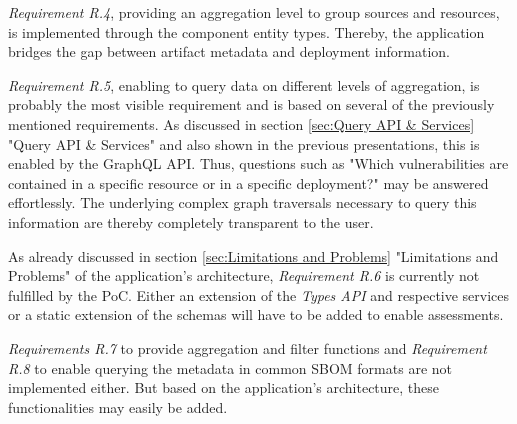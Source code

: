 \emph{Requirement R.4}, providing an aggregation level to group sources and resources, is implemented through the component entity types. Thereby, the application bridges the gap between artifact metadata and deployment information.\par
\emph{Requirement R.5}, enabling to query data on different levels of aggregation, is probably the most visible requirement and is based on several of the previously mentioned requirements. As discussed in section \ref{sec:Query API & Services} "Query API \& Services" and also shown in the previous presentations, this is enabled by the GraphQL API. Thus, questions such as "Which vulnerabilities are contained in a specific resource or in a specific deployment?" %
may be answered effortlessly. The underlying complex graph traversals necessary to query this information are thereby completely transparent to the user.\par
As already discussed in section \ref{sec:Limitations and Problems} "Limitations and Problems" of the application's architecture, \emph{Requirement R.6} is currently not fulfilled by the PoC. Either an extension of the \emph{Types API} and respective services or a static extension of the schemas will have to be added to enable assessments.\par
\emph{Requirements R.7} to provide aggregation and filter functions and \emph{Requirement R.8} to enable querying the metadata in common SBOM formats are not implemented either. But based on the application's architecture, these functionalities may easily be added.\\

